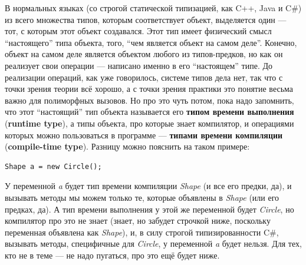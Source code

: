 \documentclass[a5paper]{article}
\begin{document}
В нормальных языках (со строгой статической типизацией, как C++, Java и C\#) из всего множества типов, которым соответствует объект, выделяется один --- тот, с которым этот объект создавался. Этот тип имеет физический смысл ``настоящего'' типа объекта, того, ``чем является объект на самом деле''. Конечно, объект на самом деле является объектом любого из типов-предков, но как он реализует свои операции --- написано именно в его ``настоящем'' типе. До реализации операций, как уже говорилось, системе типов дела нет, так что с точки зрения теории всё хорошо, а с точки зрения практики это понятие весьма важно для полиморфных вызовов. Но про это чуть потом, пока надо запомнить, что этот ``настоящий'' тип объекта называется его \textbf{типом времени выполнения} (\textbf{runtime type}), а типы объекта, про которые знает компилятор, и операциями которых можно пользоваться в программе --- \textbf{типами времени компиляции} (\textbf{compile-time type}). Разницу можно пояснить на таком примере:

\begin{verbatim}
Shape a = new Circle();
\end{verbatim}

У переменной \textit{a} будет тип времени компиляции \textit{Shape} (и все его предки, да), и вызывать методы мы можем только те, которые объявлены в \textit{Shape} (или его предках, да). А тип времени выполнения у этой же переменной будет \textit{Circle}, но компилятор про это не знает (знает, но забудет строчкой ниже, поскольку переменная объявлена как \textit{Shape}), и, в силу строгой типизированности C\#, вызывать методы, специфичные для \textit{Circle}, у переменной \textit{a} будет нельзя. Для тех, кто не в теме --- не надо пугаться, про это ещё будет ниже.
\end{document}
